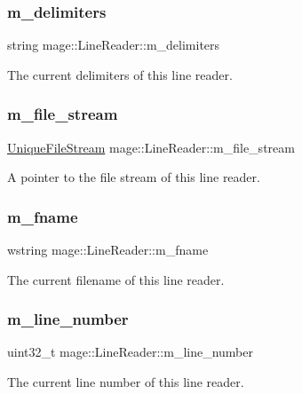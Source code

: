 \subsubsection{\texorpdfstring{m\+\_\+delimiters}{m\_delimiters}}
{\footnotesize\ttfamily string mage\+::\+Line\+Reader\+::m\+\_\+delimiters\hspace{0.3cm}{\ttfamily [private]}}

The current delimiters of this line reader. \hypertarget{classmage_1_1_line_reader_a510ff5355c6d26d7c29dc692ef18a3e2}{}\label{classmage_1_1_line_reader_a510ff5355c6d26d7c29dc692ef18a3e2} 
\subsubsection{\texorpdfstring{m\+\_\+file\+\_\+stream}{m\_file\_stream}}
{\footnotesize\ttfamily \hyperlink{namespacemage_a679c1b707dee02c7eab8d706ef14411a}{Unique\+File\+Stream} mage\+::\+Line\+Reader\+::m\+\_\+file\+\_\+stream\hspace{0.3cm}{\ttfamily [private]}}

A pointer to the file stream of this line reader. \hypertarget{classmage_1_1_line_reader_ad6f55ba12fc610ab2fc1c26a48d12321}{}\label{classmage_1_1_line_reader_ad6f55ba12fc610ab2fc1c26a48d12321} 
\subsubsection{\texorpdfstring{m\+\_\+fname}{m\_fname}}
{\footnotesize\ttfamily wstring mage\+::\+Line\+Reader\+::m\+\_\+fname\hspace{0.3cm}{\ttfamily [private]}}

The current filename of this line reader. \hypertarget{classmage_1_1_line_reader_ada0b4ec5817b96c6b1bb43bd2573f8ba}{}\label{classmage_1_1_line_reader_ada0b4ec5817b96c6b1bb43bd2573f8ba} 
\subsubsection{\texorpdfstring{m\+\_\+line\+\_\+number}{m\_line\_number}}
{\footnotesize\ttfamily uint32\+\_\+t mage\+::\+Line\+Reader\+::m\+\_\+line\+\_\+number\hspace{0.3cm}{\ttfamily [private]}}

The current line number of this line reader. 
